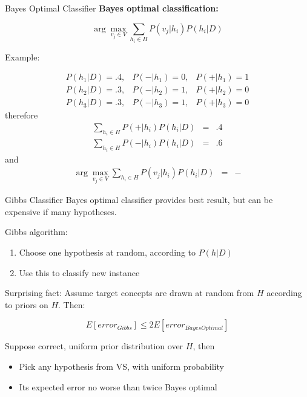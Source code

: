 \documentclass[%
pdf,
colorBG,
slideColor,
tcrico,
]{prosper}
\begin{document}

\begin{slide}{ Bayes Optimal Classifier   }  
\tiny
{\bf Bayes optimal classification: }

\[ \arg \max_{v_{j} \in V} \sum_{h_{i} \in H} P(v_{j}|h_{i}) P(h_{i}|D)\]

Example:

\begin{eqnarray}
P(h_{1}|D)=.4, & P(-|h_{1})=0, & P(+|h_{1})=1 \nonumber \\
P(h_{2}|D)=.3, & P(-|h_{2})=1, & P(+|h_{2})=0 \nonumber \\
P(h_{3}|D)=.3, & P(-|h_{3})=1, & P(+|h_{3})=0 \nonumber 
\end{eqnarray}
therefore
\begin{eqnarray}
\sum_{h_{i} \in H} P(+|h_{i}) P(h_{i}|D) & = & .4 \nonumber \\
\sum_{h_{i} \in H} P(-|h_{i}) P(h_{i}|D) & = & .6 \nonumber
\end{eqnarray}
and
\begin{eqnarray}
\arg \max_{v_{j} \in V} \sum_{h_{i} \in H} P(v_{j}|h_{i}) P(h_{i}|D) & = & -
\nonumber 
\end{eqnarray}
\end{slide}



\begin{slide}{ Gibbs Classifier   }  
\tiny
Bayes optimal classifier provides best result, but can be expensive if many
hypotheses.

Gibbs algorithm:
\begin{enumerate}
\item Choose one hypothesis at random, according to $P(h|D)$
\item Use this to classify new instance 
\end{enumerate}

Surprising fact: Assume target concepts are drawn at random from $H$ 
according to priors on $H$.  Then:

\[ E[error_{Gibbs}] \leq 2 E[error_{Bayes Optimal}] \]


Suppose correct, uniform prior distribution over $H$, then 
\begin{itemize}
\item Pick any hypothesis from VS, with uniform probability
\item Its expected error no worse than twice Bayes optimal
\end{itemize}
\end{slide}
\end{document}
